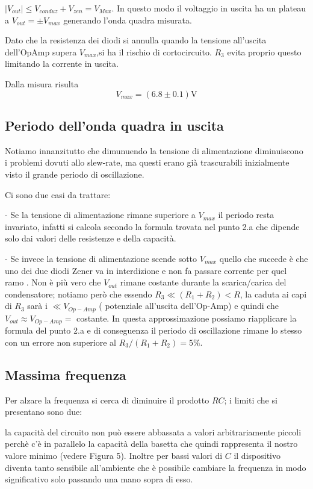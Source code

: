 \documentclass[10pt,a4paper]{article}
\begin{document}
 $|V_{out}| \le V_{conduz} +V_{zen} = V_{Max}$. In questo modo il voltaggio in uscita ha un plateau a $V_{out} = \pm V_{max}$ generando l'onda quadra misurata.

 Dato che la resistenza dei diodi si annulla quando la tensione all'uscita dell'OpAmp supera $V_{max}$,si ha il rischio di cortocircuito. $R_3$ evita proprio questo limitando la corrente in uscita.

Dalla misura risulta \[V_{max} = ( 6.8\pm 0.1) \si \volt\]

\subsection{Periodo dell'onda quadra in uscita}

Notiamo innanzitutto che dimunuendo la tensione di alimentazione diminuiscono i problemi dovuti allo slew-rate, ma questi erano già trascurabili inizialmente visto il grande periodo di oscillazione.


Ci sono due casi da trattare:

- Se la tensione di alimentazione rimane superiore a $V_{max}$ il periodo resta invariato, infatti si calcola secondo la formula trovata nel punto 2.a che  dipende solo dai valori delle resistenze e della capacità. 

- Se invece la tensione di alimentazione scende sotto $V_{max}$ quello che succede è che uno dei due diodi Zener va in interdizione e non fa passare corrente per quel ramo . Non è  più vero che $V_{out}$ rimane costante durante  la scarica/carica del condensatore; notiamo però che essendo $R_3 \ll( R_1 +R_2)< R$,  la caduta ai capi di $R_3$ sarà i $\ll V_{Op-Amp}$ ( potenziale all'uscita dell'Op-Amp) e quindi che $V_{out}\approx V_{Op-Amp} = $ costante. In questa approssimazione possiamo riapplicare la formula del punto 2.a e di conseguenza il periodo di oscillazione rimane lo stesso con un errore non superiore al $R_3/( R_1 +R_2) = 5\% $.

\subsection{Massima frequenza}



 


Per alzare la frequenza  si  cerca di diminuire il prodotto $RC$; i limiti che si presentano sono due: 

la capacità del circuito non può essere abbassata a valori arbitrariamente piccoli perchè c'è in parallelo la capacità della basetta che quindi rappresenta il nostro valore minimo (vedere Figura 5). Inoltre per bassi valori di $C$ il dispositivo diventa tanto sensibile all'ambiente che è possibile cambiare la frequenza in modo significativo solo passando una mano sopra di esso.
\end{document}
